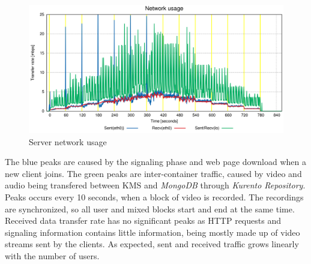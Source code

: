 \documentclass[10pt,conference]{IEEEtran}
\begin{document}
\begin{figure}
  \centering
\includegraphics[width=\linewidth]{net_usage.png}
  \caption{Server network usage}
  \label{fig:test_full_features_net}
\end{figure}


The blue peaks are caused by the signaling phase and web page download when a new client joins.
The green peaks are inter-container traffic, caused by video and audio being transfered between \gls{KMS} and \emph{MongoDB} through \emph{Kurento Repository}.
Peaks occurs every 10 seconds, when a block of video is recorded.
The recordings are synchronized, so all user and mixed blocks start and end at the same time.
Received data transfer rate has no significant peaks as \gls{HTTP} requests and signaling information contains little information, being mostly made up of video streams sent by the clients. %
As expected, sent and received traffic grows linearly with the number of users.

\end{document}
